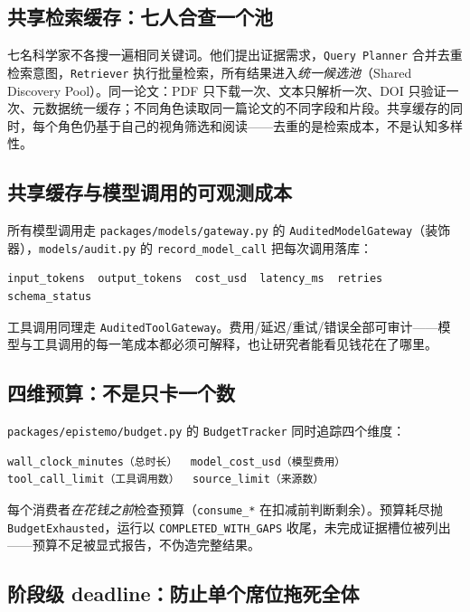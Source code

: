 \subsection{共享检索缓存：七人合查一个池}

七名科学家不各搜一遍相同关键词。他们提出证据需求，\texttt{Query Planner} 合并去重检索意图，\texttt{Retriever} 执行批量检索，所有结果进入\emph{统一候选池}（Shared Discovery Pool）。同一论文：PDF 只下载一次、文本只解析一次、DOI 只验证一次、元数据统一缓存；不同角色读取同一篇论文的不同字段和片段。共享缓存的同时，每个角色仍基于自己的视角筛选和阅读——去重的是检索成本，不是认知多样性。

\subsection{共享缓存与模型调用的可观测成本}

所有模型调用走 \texttt{packages/models/gateway.py} 的 \texttt{AuditedModelGateway}（装饰器），\texttt{models/audit.py} 的 \texttt{record\_model\_call} 把每次调用落库：

\begin{verbatim}
input_tokens  output_tokens  cost_usd  latency_ms  retries  schema_status
\end{verbatim}

工具调用同理走 \texttt{AuditedToolGateway}。费用/延迟/重试/错误全部可审计——模型与工具调用的每一笔成本都必须可解释，也让研究者能看见钱花在了哪里。

\subsection{四维预算：不是只卡一个数}

\texttt{packages/epistemo/budget.py} 的 \texttt{BudgetTracker} 同时追踪四个维度：

\begin{lstlisting}
wall_clock_minutes（总时长）  model_cost_usd（模型费用）
tool_call_limit（工具调用数）  source_limit（来源数）
\end{lstlisting}

每个消费者\emph{在花钱之前}检查预算（\texttt{consume\_*} 在扣减前判断剩余）。预算耗尽抛 \texttt{BudgetExhausted}，运行以 \texttt{COMPLETED\_WITH\_GAPS} 收尾，未完成证据槽位被列出——预算不足被显式报告，不伪造完整结果。

\subsection{阶段级 deadline：防止单个席位拖死全体}

